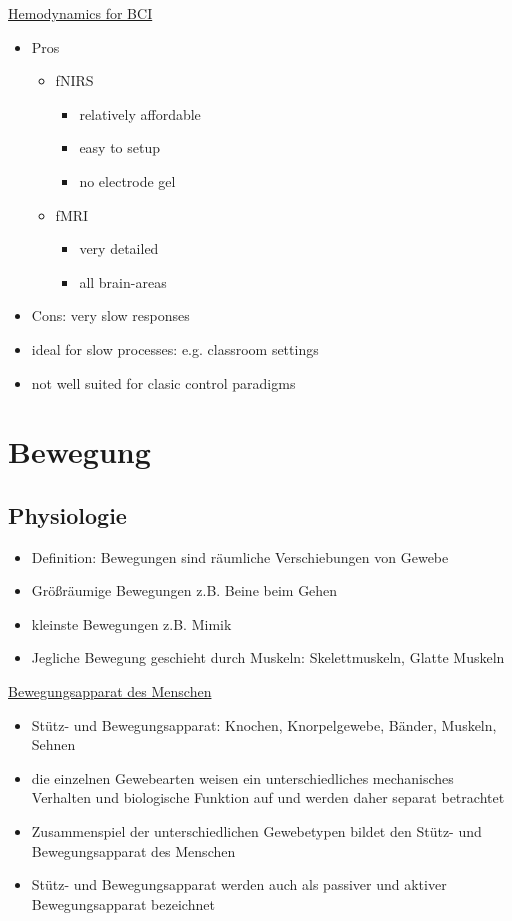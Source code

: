 \documentclass[a4paper,10pt,oneside]{article}
\begin{document}
\underline{Hemodynamics for BCI} \\
	\begin{itemize}
		\item Pros
			\begin{itemize}
				\item fNIRS
					\begin{itemize}
						\item relatively affordable
						\item easy to setup
						\item no electrode gel
					\end{itemize}
				\item fMRI
					\begin{itemize}
						\item very detailed
						\item all brain-areas
					\end{itemize}
			\end{itemize}
		\item Cons: very slow responses
		\item ideal for slow processes: e.g. classroom settings
		\item not well suited for clasic control paradigms
	\end{itemize}
 		
\section{Bewegung}
\subsection{Physiologie}
 		
	\begin{itemize}
		\item Definition: Bewegungen sind räumliche Verschiebungen von Gewebe
		\item Größräumige Bewegungen z.B. Beine beim Gehen
		\item kleinste Bewegungen z.B. Mimik
		\item Jegliche Bewegung geschieht durch Muskeln: Skelettmuskeln, Glatte Muskeln
	\end{itemize}
	

\underline{Bewegungsapparat des Menschen} \\
	\begin{itemize}
		\item Stütz- und Bewegungsapparat: Knochen, Knorpelgewebe, Bänder, Muskeln, Sehnen
		\item die einzelnen Gewebearten weisen ein unterschiedliches mechanisches Verhalten und biologische Funktion auf und werden daher separat betrachtet
		\item Zusammenspiel der unterschiedlichen Gewebetypen bildet den Stütz- und Bewegungsapparat des Menschen
		\item Stütz- und Bewegungsapparat werden auch als passiver und aktiver Bewegungsapparat bezeichnet
	\end{itemize}
	
\end{document}
